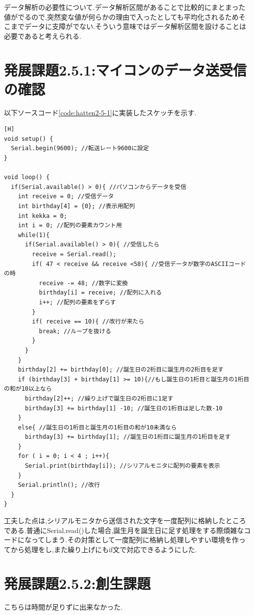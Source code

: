 \documentclass{jarticle}
\begin{document}
データ解析の必要性について.データ解析区間があることで比較的にまとまった値がでるので,突然変な値が何らかの理由で入ったとしても平均化されるためそこまでデータに支障がでない.そういう意味ではデータ解析区間を設けることは必要であると考えられる.


\section{発展課題2.5.1:マイコンのデータ送受信の確認}
以下ソースコード\ref{code:hatten2-5-1}に実装したスケッチを示す.

\begin{lstlisting}[caption = 発展課題2.5.1,label=code:hatten2-5-1][H]
void setup() {
  Serial.begin(9600); //転送レート9600に設定
}

void loop() {
  if(Serial.available() > 0){ //パソコンからデータを受信
    int receive = 0; //受信データ
    int birthday[4] = {0}; //表示用配列
    int kekka = 0;
    int i = 0; //配列の要素カウント用
    while(1){
      if(Serial.available() > 0){ //受信したら
        receive = Serial.read();
        if( 47 < receive && receive <58){ //受信データが数字のASCIIコードの時
          receive -= 48; //数字に変換
          birthday[i] = receive; //配列に入れる
          i++; //配列の要素をずらす
        }
        if( receive == 10){ //改行が来たら
          break; //ループを抜ける
        }
      }
    }
    birthday[2] += birthday[0]; //誕生日の2桁目に誕生月の2桁目を足す
    if (birthday[3] + birthday[1] >= 10){//もし誕生日の1桁目と誕生月の1桁目の和が10以上なら
      birthday[2]++; //繰り上げで誕生日の2桁目に1足す
      birthday[3] += birthday[1] -10; //誕生日の1桁目は足した数-10
    }
    else{ //誕生日の1桁目と誕生月の1桁目の和が10未満なら
      birthday[3] += birthday[1]; //誕生日の1桁目に誕生月の1桁目を足す
    }
    for ( i = 0; i < 4 ; i++){
      Serial.print(birthday[i]); //シリアルモニタに配列の要素を表示
    }
    Serial.println(); //改行
  }
}
\end{lstlisting}
工夫した点は,シリアルモニタから送信された文字を一度配列に格納したところである.普通にSerial.read()した場合,誕生月を誕生日に足す処理をする際煩雑なコードになってしまう.その対策として一度配列に格納し処理しやすい環境を作ってから処理をし,また繰り上げにもif文で対応できるようにした.

\section{発展課題2.5.2:創生課題}

こちらは時間が足りずに出来なかった.
\end{document}

